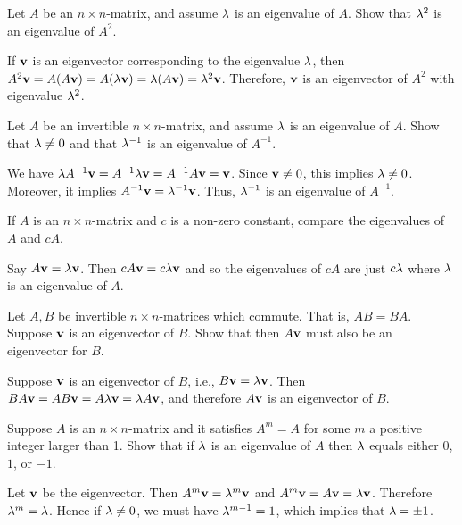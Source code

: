 \begin{ex}
  Let $A$ be an $n\times n$-matrix, and assume $\lambda$ is an
  eigenvalue of $A$. Show that $\lambda^2$ is an eigenvalue of
  $A^2$.
  \begin{sol}
    If $\vect{v}$ is an eigenvector corresponding to the eigenvalue
    $\lambda$, then $A^2\vect{v}=A(A\vect{v}) =
    A(\eigenvar\vect{v}) = \eigenvar(A\vect{v}) =
    \eigenvar^2\vect{v}$. Therefore, $\vect{v}$ is an eigenvector of
    $A^2$ with eigenvalue $\lambda^2$.
  \end{sol}
\end{ex}

\begin{ex}
  Let $A$ be an invertible $n\times n$-matrix, and assume $\lambda$
  is an eigenvalue of $A$. Show that $\lambda\neq 0$ and that
  $\lambda^{-1}$ is an eigenvalue of $A^{-1}$.
  \begin{sol}
    We have
    $\eigenvar A^{-1}\vect{v} = A^{-1}\eigenvar\vect{v} =
    A^{-1}A\vect{v} = \vect{v}$. Since $\vect{v}\neq 0$, this implies
    $\lambda\neq 0$. Moreover, it implies
    $A^{-1}\vect{v} = \eigenvar^{-1}\vect{v}$. Thus, $\lambda^{-1}$
    is an eigenvalue of $A^{-1}$.
  \end{sol}
\end{ex}

\begin{ex}
  If $A$ is an $n\times n$-matrix and $c$ is a non-zero constant,
  compare the eigenvalues of $A$ and $cA$.
  \begin{sol}
    Say $A\vect{v}=\eigenvar \vect{v}$. Then
    $ cA\vect{v}=c\eigenvar \vect{v}$ and so the eigenvalues of $cA$ are
    just $ c\lambda $ where $\lambda $ is an eigenvalue of $A$.
  \end{sol}
\end{ex}

\begin{ex}
  Let $A,B$ be invertible $n\times n$-matrices which commute. That is,
  $AB=BA$. Suppose $\vect{v}$ is an eigenvector of $B$. Show that then
  $A\vect{v}$ must also be an eigenvector for $B$.
  \begin{sol}
    Suppose $\vect{v}$ is an eigenvector of $B$, i.e.,
    $B\vect{v}=\eigenvar \vect{v}$. Then
    $BA\vect{v}=AB\vect{v} =A\eigenvar \vect{v}=\eigenvar A\vect{v}$,
    and therefore $A\vect{v}$ is an eigenvector of $B$.
  \end{sol}
\end{ex}

\begin{ex}
  Suppose $A$ is an $n\times n$-matrix and it satisfies $A^m=A$ for
  some $m$ a positive integer larger than 1. Show that if $\lambda $
  is an eigenvalue of $A$ then $\lambda$ equals either $0$, $1$, or
  $-1$.
  \begin{sol}
    Let $\vect{v}$ be the eigenvector. Then
    $A^m\vect{v}=\eigenvar^m\vect{v}$ and
    $A^m\vect{v}=A\vect{v}=\eigenvar\vect{v}$. Therefore
    $\lambda^m=\lambda$. Hence if $\lambda \neq 0$, we must
    have $\lambda^{m-1}=1$, which implies that $\lambda=\pm 1$.
  \end{sol}
\end{ex}

